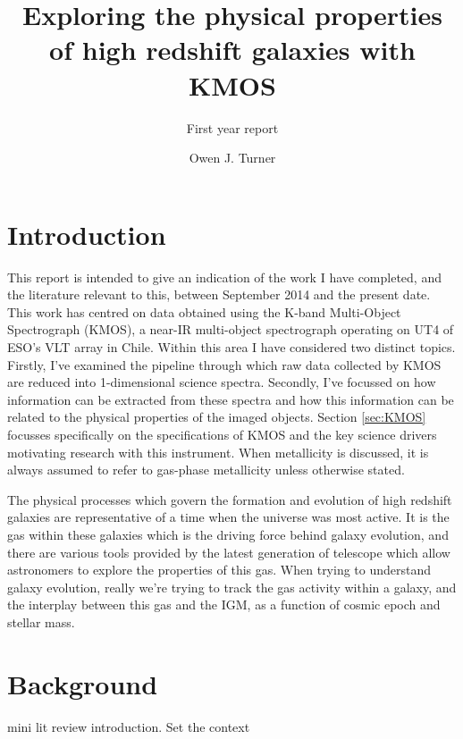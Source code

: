 \documentclass{literature}
\title{Exploring the physical properties of high redshift galaxies with KMOS}
\subtitle{First year report}
\author{Owen J. Turner}
\begin{document}
\coverpage





\section{Introduction}\label{sec:Intro}
This report is intended to give an indication of the work I have completed, and the literature relevant to this, between September 2014 and the present date. This work has centred on data obtained using the K-band Multi-Object Spectrograph (KMOS), a near-IR multi-object spectrograph operating on UT4 of ESO's VLT array in Chile. Within this area I have considered two distinct topics. Firstly, I've examined the pipeline through which raw data collected by KMOS are reduced into 1-dimensional science spectra. Secondly, I've focussed on how information can be extracted from these spectra and how this information can be related to the physical properties of the imaged objects.   Section \ref{sec:KMOS} focusses specifically on the specifications of KMOS and the key science drivers motivating research with this instrument. When metallicity is discussed, it is always assumed to refer to gas-phase metallicity unless otherwise stated.



The physical processes which govern the formation and evolution of high redshift galaxies are representative of a time when the universe was most active. It is the gas within these galaxies which is the driving force behind galaxy evolution, and there are various tools provided by the latest generation of telescope which allow astronomers to explore the properties of this gas. When trying to understand galaxy evolution, really we're trying to track the gas activity within a galaxy, and the interplay between this gas and the IGM, as a function of cosmic epoch and stellar mass. \\ 









\section{Background}\label{sec:background}
mini lit review introduction. Set the context 
\end{document}
